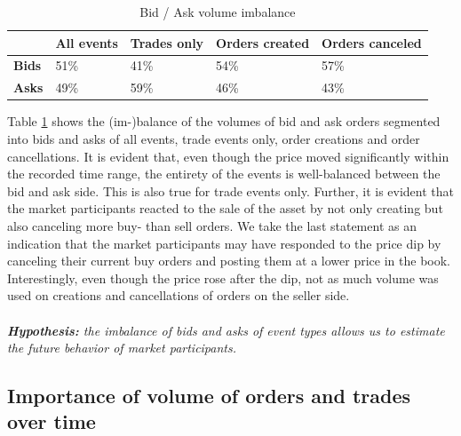 \begin{table}[H]
\centering
\begin{tabular}{l|l|l|l|l|}
\cline{2-5}
& \textbf{All events} & \textbf{Trades only} & \textbf{Orders created} & \textbf{Orders canceled} \\ \hline
\multicolumn{1}{|l|}{\textbf{Bids}} & 51\%                & 41\%                 & 54\%                    & 57\%                      \\ \hline
\multicolumn{1}{|l|}{\textbf{Asks}} & 49\%                & 59\%                 & 46\%                    & 43\%                      \\ \hline
\end{tabular}
\caption{Bid / Ask volume imbalance}
\label{tbl:data-imbalance}
\end{table}

Table \ref{tbl:data-imbalance} shows the (im-)balance of the volumes of bid and ask orders segmented into bids and asks of all events, trade events only, order creations and order cancellations.
It is evident that, even though the price moved significantly within the recorded time range, the entirety of the events is well-balanced between the bid and ask side.
This is also true for trade events only.
Further, it is evident that the market participants reacted to the sale of the asset by not only creating but also canceling more buy- than sell orders.
We take the last statement as an indication that the market participants may have responded to the price dip by canceling their current buy orders and posting them at a lower price in the book.
Interestingly, even though the price rose after the dip, not as much volume was used on creations and cancellations of orders on the seller side.
\\
\\
\textit{\textbf{Hypothesis:} the imbalance of bids and asks of event types allows us to estimate the future behavior of market participants.}

\subsection{Importance of volume of orders and trades over time}
\label{sec:data-hypthesis-order-trade-volume-time}

